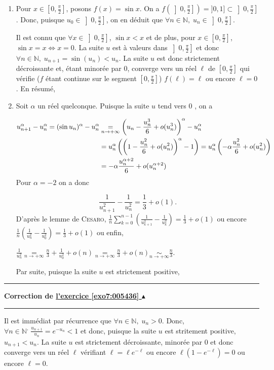 \documentclass[11pt,a4paper]{article}
\newcommand{\Nn}{\mathbb{N}} \newcommand{\N}{\mathbb{N}}
\newcounter{exo}
\newcommand{\correction}[1]{\hypertarget{cor7:#1}{}\label{cor7:#1}{\bf Correction de \hyperlink{exo7:#1}{l'exercice \ref{exo7:#1} $\blacktriangle$}}\vspace{1mm}\hrule\vspace{1mm}}
\newcommand{\fincorrection}{\vspace{1mm}\hrule\vspace*{7mm}}
\begin{document}
\begin{enumerate}
 \item  
Pour $x\in\left[0,\frac{\pi}{2}\right]$, posons $f(x)=\sin x$. On a $f\left(\left]0,\frac{\pi}{2}\right]\right)=]0,1]\subset\left]0,\frac{\pi}{2}\right]$. Donc, puisque $u_0\in\left]0,\frac{\pi}{2}\right]$, on en déduit que $\forall n\in\Nn,\;u_n\in\left]0,\frac{\pi}{2}\right]$.\rule[-5mm]{0mm}{10mm}
Il est connu que $\forall x\in\left]0,\frac{\pi}{2}\right]$, $\sin x<x$ et de plus, pour $x\in\left[0,\frac{\pi}{2}\right]$, $\sin x=x\Leftrightarrow x=0$.
La suite $u$ est à valeurs dans $\left]0,\frac{\pi}{2}\right]$ et donc $\forall n\in\Nn,\;u_{n+1}=\sin(u_n)<u_n$. La suite $u$ est donc strictement décroissante et, étant minorée par $0$, converge vers un réel $\ell$ de $\left[0,\frac{\pi}{2}\right]$ qui vérifie ($f$ étant continue sur le segment $\left[0,\frac{\pi}{2}\right]$) $f(\ell)=\ell$ ou encore $\ell=0$.
En résumé,

\begin{center}
\end{center}
 \item  Soit $\alpha$ un réel quelconque. Puisque la suite $u$ tend vers 0 , on a

\begin{align*}\ensuremath
u_{n+1}^{\alpha}-u_n^{\alpha}=(\sin u_n)^{\alpha}-u_n^{\alpha}&\underset{n\rightarrow+\infty}{=}\left(u_n-\frac{u_n^3}{6}+o(u_n^3)\right)^{\alpha}-u_n^{\alpha}\\
 &=u_n^{\alpha}\left(\left(1-\frac{u_n^2}{6}+o(u_n^2)\right)^{\alpha}-1\right)=u_n^{\alpha}\left(-\alpha\frac{u_n^2}{6}+o(u_n^2)\right)\\
 &=-\alpha\frac{u_n^{\alpha+2}}{6}+o(u_n^{\alpha+2})
\end{align*}
Pour $\alpha=-2$ on a donc 

$$\frac{1}{u_{n+1}^2}-\frac{1}{u_n^2}=\frac{1}{3}+o(1).$$
D'après le lemme de \textsc{Cesaro}, $\frac{1}{n}\sum_{k=0}^{n-1}\left(\frac{1}{u_{k+1}^2}-\frac{1}{u_k^2}\right)=\frac{1}{3}+o(1)$ ou encore $\frac{1}{n}\left(\frac{1}{u_n^2}-\frac{1}{u_0^2}\right)=\frac{1}{3}+o(1)$ ou enfin, 

\begin{center}
$\frac{1}{u_n^2}\underset{n\rightarrow+\infty}{=}\frac{n}{3}+\frac{1}{u_0^2}+o(n)\underset{n\rightarrow+\infty}{=}\frac{n}{3}+o(n)\underset{n\rightarrow+\infty}{\sim}\frac{n}{3}$.
\end{center}
Par suite, puisque la suite $u$ est strictement positive, 

\begin{center}
\end{center}
\end{enumerate}
\fincorrection
\correction{005436}
Il est immédiat par récurrence que $\forall n\in\Nn,\;u_n>0$. Donc, $\forall n\in\Nn^,\;\frac{u_{n+1}}{u_n}=e^{-u_n}<1$ et donc, puisque la suite $u$ est stritement positive, $u_{n+1}<u_n$. La suite $u$ est strictement décroissante, minorée par $0$ et donc converge vers un réel $\ell$ vérifiant $\ell=\ell e^{-\ell}$ ou encore $\ell(1-e^{-\ell})=0$ ou encore $\ell=0$.
\end{document}
